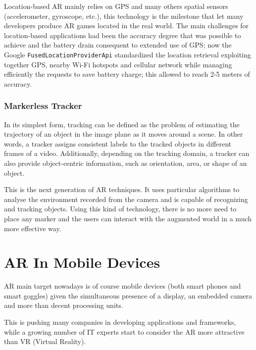 			Location-based AR mainly relies on GPS and many others spatial sensors (accelerometer, gyroscope, etc.), this technology is the milestone that let many developers produce AR games located in the real world.
			The main challenges for location-based applications had been the accuracy degree that was possible to achieve and the battery drain consequent to extended use of GPS; now the Google \lstinline|FusedLocationProviderApi| standardized the location retrieval exploiting together GPS, nearby Wi-Fi hotspots and cellular network while managing efficiently the requests to save battery charge; this allowed to reach 2-5 meters of accuracy. %

		\subsubsection{Markerless Tracker}
			
			\begin{quoting}
				In its simplest form, tracking can be defined as the problem of estimating the trajectory of an object in the image plane as it moves around a scene. In other words, a tracker assigns consistent labels to the tracked objects in different frames of a video. Additionally, depending on the tracking domain, a tracker can also provide object-centric information, such as orientation, area, or shape of an object.~\cite{ylmaz:tracking}
			\end{quoting}
			
			This is the next generation of AR techniques. It uses particular algorithms to analyse the environment recorded from the camera and is capable of recognizing and tracking objects. Using this kind of technology, there is no more need to place any marker and the users can interact with the augmented world in a much more effective way.
			
	
	\section{AR In Mobile Devices}
	
		AR main target nowadays is of course mobile devices (both smart phones and smart goggles) given the simultaneous presence of a display, an embedded camera and more than decent processing units.
		
		This is pushing many companies in developing applications and frameworks, while a growing number of IT experts start to consider the AR more attractive than VR (Virtual Reality).
		
